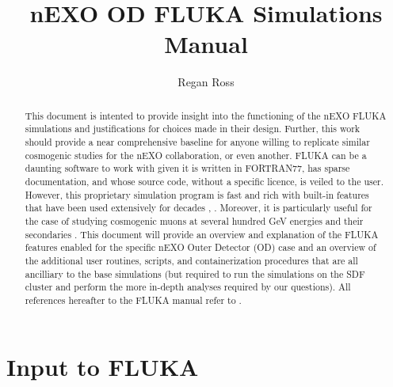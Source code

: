 \documentclass[10pt]{article}
\title{nEXO OD FLUKA Simulations Manual}
\author{Regan Ross}
\begin{document}
\begin{titlepage}
    \maketitle
    \vspace{4cm}
    \centering
\end{titlepage}

\begin{abstract}
    This document is intented to provide insight into the functioning of the nEXO FLUKA simulations and justifications for choices made in their design. Further, this work should provide a near comprehensive baseline for anyone willing to replicate similar cosmogenic studies for the nEXO collaboration, or even another. FLUKA can be a daunting software to work with given it is written in FORTRAN77, has sparse documentation, and whose source code, without a specific licence, is veiled to the user. However, this proprietary simulation program is fast and rich with built-in features that have been used extensively for decades \cite{FLUKA1}, \cite{FLUKA2}. Moreover, it is particularly useful for the case of studying cosmogenic muons at several hundred GeV energies and their secondaries \cite{gratta_muons_to_neutrons} \cite{KamLand_Zen}. This document will provide an overview and explanation of the FLUKA features enabled for the specific nEXO Outer Detector (OD) case and an overview of the additional user routines, scripts, and containerization procedures that are all ancilliary to the base simulations (but required to run the simulations on the SDF cluster and perform the more in-depth analyses required by our questions).  All references hereafter to the FLUKA manual refer to \cite{FLUKA_Manual}.


\end{abstract}

\vspace{1.5cm}
\listoffigures

\newpage
\tableofcontents

\break

\part*{Input to FLUKA}
\end{document}

